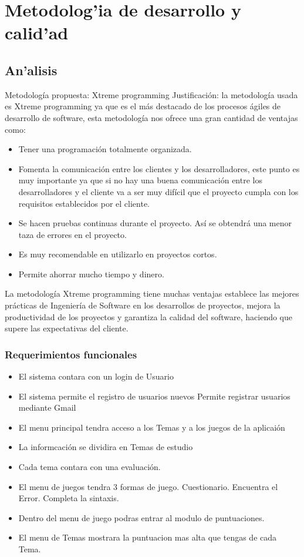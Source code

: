 \chapter{Metodolog'ia de desarrollo y calid'ad}
\section{An'alisis}
\begin{center}

\end{center}

Metodología propuesta: Xtreme programming
Justificación: la metodología usada es Xtreme programming ya que es el más destacado de los procesos ágiles de desarrollo de software, esta metodología nos ofrece una gran cantidad de ventajas como:
\begin{itemize}
\item Tener una programación totalmente organizada.
\item Fomenta la comunicación entre los clientes y los desarrolladores, este punto es muy importante ya que si no hay una buena comunicación entre los desarrolladores y el cliente va a ser muy difícil que el proyecto cumpla con los requisitos establecidos por el cliente.
\item Se hacen pruebas continuas durante el proyecto. Así se obtendrá una menor taza de errores en el proyecto.
\item Es muy recomendable en utilizarlo en proyectos cortos.
\item Permite ahorrar mucho tiempo y dinero.
\end{itemize}

La metodología Xtreme programming tiene muchas ventajas establece las mejores prácticas de Ingeniería de Software en los desarrollos de proyectos, mejora la productividad de los proyectos y garantiza la calidad del software, haciendo que supere las expectativas del cliente.

\subsection{Requerimientos funcionales}
\begin{itemize}
\item El sistema contara  con un login de Usuario
\item El sistema permite el registro de usuarios nuevos
\subitem Permite registrar usuarios mediante Gmail
\item El menu principal tendra acceso a los Temas y a los juegos de la aplicaión
\item La informcación se dividira en Temas de estudio 
\item Cada tema contara con una evaluación.
\item El menu de juegos tendra 3 formas de juego.
\subitem Cuestionario.
\subitem Encuentra el Error.
\subitem Completa la sintaxis.
\item Dentro del menu de juego podras entrar al modulo de puntuaciones.
\item El menu de Temas mostrara la puntuacion mas alta que tengas de cada Tema.
\end{itemize}

